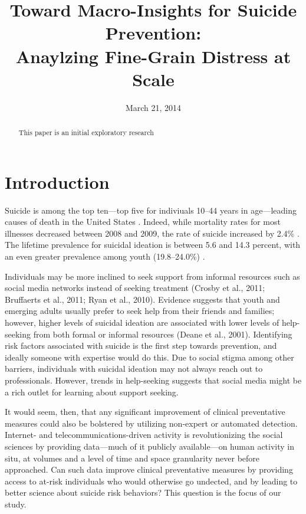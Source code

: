 \documentclass[11pt]{article}
\title{Toward Macro-Insights  for Suicide Prevention: \\ Anaylzing Fine-Grain Distress at Scale}
\date{March 21, 2014}
\begin{document}
\maketitle
\begin{abstract}

This paper is an initial exploratory research 
 \end{abstract}

\section{Introduction}


Suicide is among the top ten---top five for indiviuals 10--44 years in age---leading causes of death in the United States \cite{heron2009deaths}. Indeed, while mortality rates for most illnesses decreased between 2008 and 2009, the rate of suicide increased by 2.4\%  \cite{heron2009deaths}. The lifetime prevalence for suicidal ideation is between 5.6 and 14.3 percent, with an even greater prevalence among youth (19.8–24.0\%) \cite{nock2008suicide}. 

Individuals may be more inclined to seek support from informal resources such as social media networks instead of seeking treatment (Crosby et al., 2011; Bruffaerts et al., 2011; Ryan et al., 2010). Evidence suggests that youth and emerging adults usually prefer to seek help from their friends and families; however, higher levels of suicidal ideation are associated with lower levels of help-seeking from both formal or informal resources (Deane et al., 2001).  Identifying risk factors associated with suicide is the first step towards prevention, and ideally someone with expertise would do this.  Due to social stigma among other barriers, individuals with suicidal ideation may not always reach out to professionals. However, trends in help-seeking suggests that social media might be a rich outlet for learning about support seeking.

It would seem, then, that any significant improvement of clinical preventative measures could also be bolstered by utilizing non-expert or automated detection. 
Internet- and telecommunications-driven activity is revolutionizing the social sciences by providing data---much of it publicly available---on human activity in situ, at volumes and a level of time and space granularity never before approached. Can such data improve clinical preventative measures by providing access to at-risk individuals who would otherwise go undected, and by leading to better science about suicide risk behaviors? This question is the focus of our study.
\end{document}
